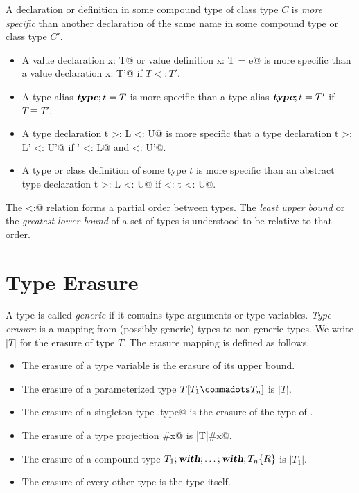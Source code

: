 \documentclass[11pt]{report}
\begin{document}
A declaration or definition in some compound type of class type $C$
is {\em more specific} than another
declaration of the same name in some compound type or class type $C'$.
\begin{itemize}
\item
A value declaration \verb@val x: T@ or value definition
\verb@val x: T = e@ is more specific than a value declaration
\verb@val x: T'@ if $T <: T'$.
\item
A type alias
$\mbox{\sl\bfseries type};t=T$ is more specific than a type alias $\mbox{\sl\bfseries type};t=T'$ if
$T \equiv T'$.
\item 
A type declaration \verb@type t >: L <: U@ is more specific that 
a type declaration \verb@type t >: L' <: U'@ if \verb@L' <: L@ and \verb@U <: U'@.
\item
A type or class definition of some type $t$ is more specific than an abstract
type declaration \verb@type t >: L <: U@ if
\verb@L <: t <: U@.
\end{itemize}

The \verb@<:@ relation forms a partial order between types. The {\em
least upper bound} or the {\em greatest lower bound} of a set of types
is understood to be relative to that order.

\section{Type Erasure}
\label{sec:erasure}

A type is called {\em generic} if it contains type arguments or type variables.
{\em Type erasure} is a mapping from (possibly generic) types to
non-generic types. We write $|T|$ for the erasure of type $T$.
The erasure mapping is defined as follows.
\begin{itemize}
\item The erasure of a type variable is the erasure of its upper bound.
\item The erasure of a parameterized type $T[T_1 \commadots T_n]$ is $|T|$.
\item The erasure of a singleton type \verb@p.type@ is the 
      erasure of the type of \verb@p@.
\item The erasure of a type projection \verb@T#x@ is \verb@|T|#x@.
\item The erasure of a compound type $T_1;\mbox{\sl\bfseries with};\ldots;\mbox{\sl\bfseries with};T_n\{R\}$ is $|T_1|$.
\item The erasure of every other type is the type itself.
\end{itemize}
\end{document}
